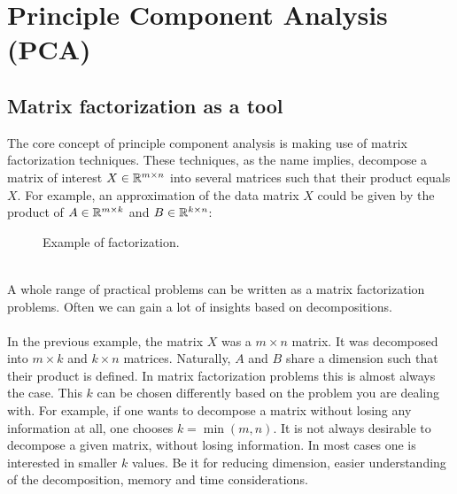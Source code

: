 \renewcommand{\this}{PCA}

\chapter{Principle Component Analysis (PCA)}
	\section{Matrix factorization as a tool}
		The core concept of principle component analysis is making use of matrix factorization techniques. These techniques, as the name implies, decompose a matrix of interest $X \in \mathbb{R}^{m \times n}$ into several matrices such that their product equals $X$. For example, an approximation of the data matrix $X$ could be given by the product of $A \in \mathbb{R}^{m \times k}$ and $B \in \mathbb{R}^{k \times n}$:\\
		\begin{figure}[h!]
			\centering	
			\label{approx}
			\caption{Example of factorization.}
		\end{figure}\\
		A whole range of practical problems can be written as a matrix factorization problems. Often we can gain a lot of insights based on decompositions.
\\\\
In the previous example, the matrix $X$ was a $m \times n$ matrix. 
It was decomposed into $m \times k$ and $k \times n$ matrices. 
Naturally, $A$ and $B$ share a dimension such that their product
is defined. In matrix factorization problems this is almost always
the case. This $k$ can be chosen differently based on the problem 
you are dealing with. For example, if one wants to decompose a 
matrix without losing any information at all, one chooses 
$k = \min(m, n)$. It is not always desirable to decompose a 
given matrix, without losing information. In most cases one is
interested in smaller $k$ values. Be it for reducing dimension, 
easier understanding of the decomposition, memory and time 
considerations.

